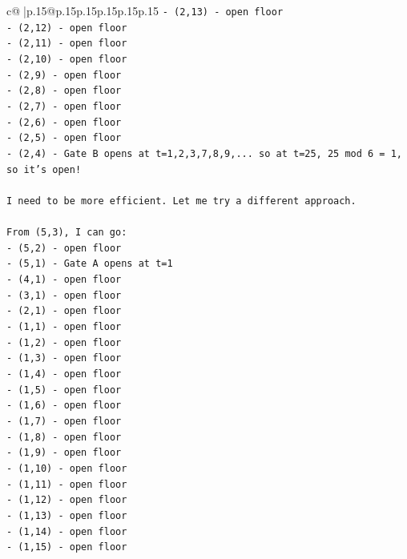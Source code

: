 \documentclass{article}
\begin{document}
{\begin{supertabular}{c@{$\;$}|p{.15\linewidth}@{}p{.15\linewidth}p{.15\linewidth}p{.15\linewidth}p{.15\linewidth}p{.15\linewidth}}
{{{\texttt{{-} (2,13) {-} open floor} \\
\texttt{{-} (2,12) {-} open floor} \\
\texttt{{-} (2,11) {-} open floor} \\
\texttt{{-} (2,10) {-} open floor} \\
\texttt{{-} (2,9) {-} open floor} \\
\texttt{{-} (2,8) {-} open floor} \\
\texttt{{-} (2,7) {-} open floor} \\
\texttt{{-} (2,6) {-} open floor} \\
\texttt{{-} (2,5) {-} open floor} \\
\texttt{{-} (2,4) {-} Gate B opens at t=1,2,3,7,8,9,... so at t=25, 25 mod 6 = 1, so it's open!} \\
\\ 
\texttt{I need to be more efficient. Let me try a different approach.} \\
\\ 
\texttt{From (5,3), I can go:} \\
\texttt{{-} (5,2) {-} open floor} \\
\texttt{{-} (5,1) {-} Gate A opens at t=1} \\
\texttt{{-} (4,1) {-} open floor} \\
\texttt{{-} (3,1) {-} open floor} \\
\texttt{{-} (2,1) {-} open floor} \\
\texttt{{-} (1,1) {-} open floor} \\
\texttt{{-} (1,2) {-} open floor} \\
\texttt{{-} (1,3) {-} open floor} \\
\texttt{{-} (1,4) {-} open floor} \\
\texttt{{-} (1,5) {-} open floor} \\
\texttt{{-} (1,6) {-} open floor} \\
\texttt{{-} (1,7) {-} open floor} \\
\texttt{{-} (1,8) {-} open floor} \\
\texttt{{-} (1,9) {-} open floor} \\
\texttt{{-} (1,10) {-} open floor} \\
\texttt{{-} (1,11) {-} open floor} \\
\texttt{{-} (1,12) {-} open floor} \\
\texttt{{-} (1,13) {-} open floor} \\
\texttt{{-} (1,14) {-} open floor} \\
\texttt{{-} (1,15) {-} open floor} \\
}}}
\end{supertabular}}
\end{document}
